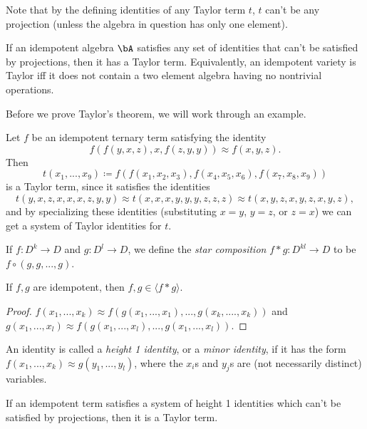 Note that by the defining identities of any Taylor term $t$, $t$ can't be any projection (unless the algebra in question has only one element).

\begin{thm} If an idempotent algebra $\bA$ satisfies any set of identities that can't be satisfied by projections, then it has a Taylor term. Equivalently, an idempotent variety is Taylor iff it does not contain a two element algebra having no nontrivial operations.
\end{thm}

Before we prove Taylor's theorem, we will work through an example.

\begin{ex} Let $f$ be an idempotent ternary term satisfying the identity
\[
f(f(y,x,z),x,f(z,y,y)) \approx f(x,y,z).
\]
Then
\[
t(x_1, ..., x_9) \coloneqq f(f(x_1,x_2,x_3), f(x_4,x_5,x_6), f(x_7,x_8,x_9))
\]
is a Taylor term, since it satisfies the identities
\[
t(y,x,z,x,x,x,z,y,y) \approx t(x,x,x,y,y,y,z,z,z) \approx t(x,y,z,x,y,z,x,y,z),
\]
and by specializing these identities (substituting $x=y$, $y=z$, or $z=x$) we can get a system of Taylor identities for $t$.
\end{ex}

\begin{defn}\label{star-comp-defn} If $f : D^k \rightarrow D$ and $g : D^l \rightarrow D$, we define the \emph{star composition} $f * g : D^{kl} \rightarrow D$ to be $f\circ (g, g, ..., g)$.
\end{defn}

\begin{prop} If $f,g$ are idempotent, then $f,g \in \langle f*g \rangle$.
\end{prop}
\begin{proof} $f(x_1, ..., x_k) \approx f(g(x_1, ..., x_1), ..., g(x_k, ...., x_k))$ and $g(x_1, ..., x_l) \approx f(g(x_1, ..., x_l), ..., g(x_1, ..., x_l))$.
\end{proof}

\begin{defn} An identity is called a \emph{height 1 identity}, or a \emph{minor identity}, if it has the form $f(x_1, ..., x_k) \approx g(y_1, ..., y_l)$, where the $x_i$s and $y_j$s are (not necessarily distinct) variables.
\end{defn}

\begin{prop} If an idempotent term satisfies a system of height 1 identities which can't be satisfied by projections, then it is a Taylor term.
\end{prop}

